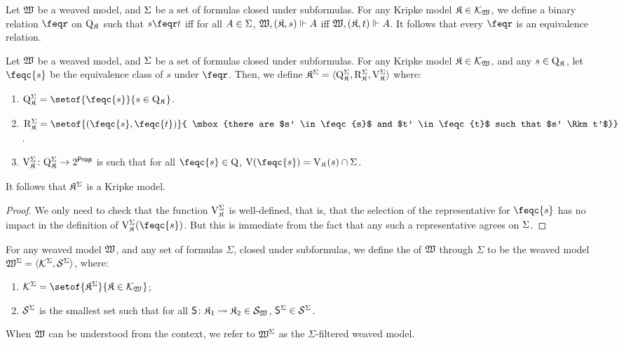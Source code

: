 \begin{proposition}
    Let $\mathfrak{W}$ be a weaved model, and $\Sigma$ be a set of formulas closed under subformulas.
    For any Kripke model $\mathfrak{K} \in \mathcal{K}_{\mathfrak{W}_{}}$, we define a binary relation $\feqr$ on $\mathrm{Q}_{\mathfrak{K}_{}}$ such that $s \feqr t$ iff for all $A \in \Sigma$, ${\mathfrak{W},(\mathfrak{K},s)}\Vdash{A}$ iff ${\mathfrak{W},(\mathfrak{K},t)}\Vdash{A}$.
    It follows that every $\feqr$ is an equivalence relation.
\end{proposition}

\begin{proposition}
    Let $\mathfrak{W}$ be a weaved model, and $\Sigma$ be a set of formulas closed under subformulas.
    For any Kripke model $\mathfrak{K} \in \mathcal{K}_{\mathfrak{W}_{}}$, and any $s \in \mathrm{Q}_{\mathfrak{K}_{}}$, let $\feqc{s}$ be the equivalence class of $s$ under $\feqr$.
    Then, we define $\mathfrak{K}_{}^{\Sigma} = \langle\mathrm{Q}_{\mathfrak{K}_{}}^{\Sigma}, \mathbin{\mathrm{R}}_{\mathfrak{K}_{}}^{\Sigma}, \mathrm{V}_{\mathfrak{K}_{}}^{\Sigma}\rangle$ where:

        \begin{enumerate}
            \item $\Wfm = \setof{\feqc{s}}{s \in \Wkm}$.
            \item $\Rfm = \setof{\pair {\feqc{s}} {\feqc{t}}}{ \mbox{there are $s' \in \feqc{s}$ and $t' \in \feqc{t}$ such that $s' \Rkm t'$}}$.
            \item $\mathrm{V}_{\mathfrak{K}_{}}^{\Sigma} \colon \mathrm{Q}_{\mathfrak{K}_{}}^{\Sigma} \to 2^{\mathsf{Prop}}$ is such that for all $\feqc{s} \in \W$, $\V(\feqc{s}) = \Vkm(s) \cap \Sigma$.
        \end{enumerate}
    
    \noindent
    It follows that $\mathfrak{K}_{}^{\Sigma}$ is a Kripke model.
\end{proposition}
\begin{proof}
    We only need to check that the function $\mathrm{V}_{\mathfrak{K}_{}}^{\Sigma}$ is well-defined, that is, that the selection of the representative for $\feqc{s}$ has no impact in the definition of $\Vfm(\feqc{s})$.
    But this is immediate from the fact that any such a representative agrees on $\Sigma$.
\end{proof}

\begin{definition}
    For any weaved model $\mathfrak{W}$, and any set of formulas $\Sigma$, closed under subformulas, we define the  of $\mathfrak{W}$ through $\Sigma$ to be the weaved model $\mathfrak{W}^{\Sigma} = \langle\mathcal{K}_{}^{\Sigma}, \mathcal{S}_{}^{\Sigma}\rangle$, where:
    \begin{enumerate}[leftmargin=\parindent]
        \setlength{\itemsep}{0pt}
        \item $\Kfwm = \setof{\fmodel}{\kmodel \in \Kwm}$;
        
        \item $\mathcal{S}_{}^{\Sigma}$ is the smallest set such that for all $\mathbin{\mathsf{S}} \colon \mathfrak{K}_1 \rightsquigarrow \mathfrak{K}_2 \in \mathcal{S}_{\mathfrak{W}_{}}$,
            $\mathbin{\mathsf{S}}^{\Sigma} \in \mathcal{S}_{}^{\Sigma}$.
    \end{enumerate}
    When $\mathfrak{W}$ can be understood from the context, we refer to $\mathfrak{W}^{\Sigma}$ as the $\Sigma$-filtered weaved model.
\end{definition}

